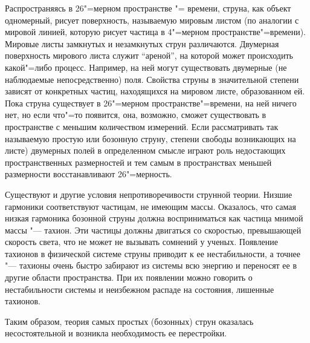 Распространяясь в 26"=мерном пространстве "= времени, струна, как объект одномерный,
рисует поверхность, называемую мировым листом
(по аналогии с мировой линией, которую рисует частица в 4"=мерном пространстве"=времени).
Мировые листы замкнутых и незамкнутых струн различаются.
Двумерная поверхность мирового листа служит “ареной”, на которой может происходить какой"=либо процесс.
Например, на ней могут существовать двумерные (не наблюдаемые непосредственно) поля.
Свойства струны в значительной степени зависят от конкретных частиц, находящихся на мировом листе, образованном ей.
Пока струна существует в 26"=мерном пространстве"=времени, на ней ничего нет,
но если что"=то появится, она, возможно, сможет существовать в пространстве с меньшим количеством измерений.
Если рассматривать так называемую простую или бозонную струну, степени свободы возникающих на листе)
двумерных полей в определенном смысле играют роль недостающих пространственных размерностей и тем самым в пространствах меньшей размерности восстанавливают 26"=мерность.

Существуют и другие условия непротиворечивости струнной теории.
Низшие гармоники соответствуют частицам, не имеющим массы.
Оказалось, что самая низкая гармоника бозонной струны должна восприниматься как частица мнимой массы "--- тахион.
Эти частицы должны двигаться со скоростью,
превышающей скорость света, что не может не вызывать сомнений у ученых.
Появление тахионов в физической системе струны приводит к ее нестабильности, а точнее "---
тахионы очень быстро забирают из системы всю энергию и переносят ее в другие области пространства.
При их появлении можно говорить о нестабильности системы и неизбежном распаде на состояния, лишенные тахионов. 

Таким образом, теория самых простых (бозонных)
струн оказалась несостоятельной и возникла необходимость ее перестройки.